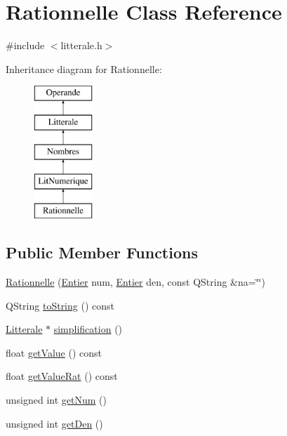 \hypertarget{class_rationnelle}{}\section{Rationnelle Class Reference}
\label{class_rationnelle}


{\ttfamily \#include $<$litterale.\+h$>$}

Inheritance diagram for Rationnelle\+:\begin{figure}[H]
\begin{center}
\leavevmode
\includegraphics[height=5.000000cm]{class_rationnelle}
\end{center}
\end{figure}
\subsection*{Public Member Functions}
\begin{DoxyCompactItemize}
\item 
\hyperlink{class_rationnelle_ad81843f23e1bc08340d7028ccf9f33da}{Rationnelle} (\hyperlink{class_entier}{Entier} num, \hyperlink{class_entier}{Entier} den, const Q\+String \&na=\char`\"{}\char`\"{})
\item 
Q\+String \hyperlink{class_rationnelle_a406d82b3db71b5d7cac720a12e756c3c}{to\+String} () const 
\item 
\hyperlink{class_litterale}{Litterale} $\ast$ \hyperlink{class_rationnelle_a065e5d1e2c9a855387572c8bd68d50d1}{simplification} ()
\item 
float \hyperlink{class_rationnelle_a7ad6ea7c336cff4e7c897ce1b1eae141}{get\+Value} () const 
\item 
float \hyperlink{class_rationnelle_a65453f519fa0c404639d4305edf48dba}{get\+Value\+Rat} () const 
\item 
unsigned int \hyperlink{class_rationnelle_a1888caed6c60ad7d0a30c3f784235b71}{get\+Num} ()
\item 
unsigned int \hyperlink{class_rationnelle_a453cdf92bbdbc0f7a3233d2d60d6146b}{get\+Den} ()
\end{DoxyCompactItemize}
